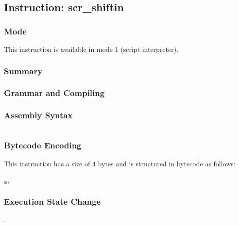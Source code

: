 \subsection{Instruction: scr\_shiftin}

\subsubsection{Mode}
This instruction is available in mode 1 (script interpreter).
\subsubsection{Summary}


\subsubsection{Grammar and Compiling}


\subsubsection{Assembly Syntax}

\begin{myquote}
\begin{verbatim}

\end{verbatim}
\end{myquote}

\subsubsection{Bytecode Encoding}

This instruction has a size of 4 bytes and is structured in bytecode as follows:

$_{00}$\ 

\subsubsection{Execution State Change}

.



